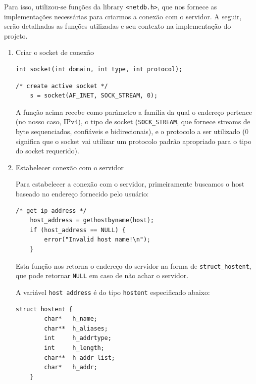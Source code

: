 \documentclass[10pt,twocolumn,letterpaper]{article}
\begin{document}
 Para isso, utilizou-se funções da library \texttt{<netdb.h>}, que nos fornece as implementações necessárias para criarmos a conexão com o servidor. A seguir, serão detalhadas as funções utilizadas e seu contexto na implementação do projeto.

\begin{enumerate}
	\item Criar o socket de conexão

	\begin{lstlisting}[caption={Função utilizada para criação do socket}, label=Algorithm]
    int socket(int domain, int type, int protocol);
	\end{lstlisting}

	\begin{lstlisting}[caption={Aplicação da função na implementação do projeto}, label=Algorithm]
    /* create active socket */
    s = socket(AF_INET, SOCK_STREAM, 0);
	\end{lstlisting}

	A função acima recebe como parâmetro a família da qual o endereço pertence (no nosso caso, IPv4), o tipo de socket (\texttt{SOCK\_STREAM}, que fornece streams de byte sequenciados, confiáveis e bidirecionais), e o protocolo a ser utilizado (0 significa que o socket vai utilizar um protocolo padrão apropriado para o tipo do socket requerido).
	

	\item Estabelecer conexão com o servidor

	Para estabelecer a conexão com o servidor, primeiramente buscamos o host baseado no endereço fornecido pelo usuário:

	\begin{lstlisting}[caption={Função utilizada para acessar o endereço do host}, label=Algorithm]
    /* get ip address */
    host_address = gethostbyname(host);
    if (host_address == NULL) {
        error("Invalid host name!\n");
    }
	\end{lstlisting}

	Esta função nos retorna o endereço do servidor na forma de \texttt{struct\_hostent}, que pode retornar \texttt{NULL} em caso de não achar o servidor.

	A variável \texttt{host address} é do tipo \texttt{hostent} especificado abaixo:

	\begin{lstlisting}[caption={Struct\_hostent}, label=Algorithm]
    struct hostent {
    	char* 	h_name;
    	char** 	h_aliases;
    	int 	h_addrtype;
    	int 	h_length;
    	char** 	h_addr_list;
    	char* 	h_addr;
    }
	\end{lstlisting}


\end{enumerate}
\end{document}
